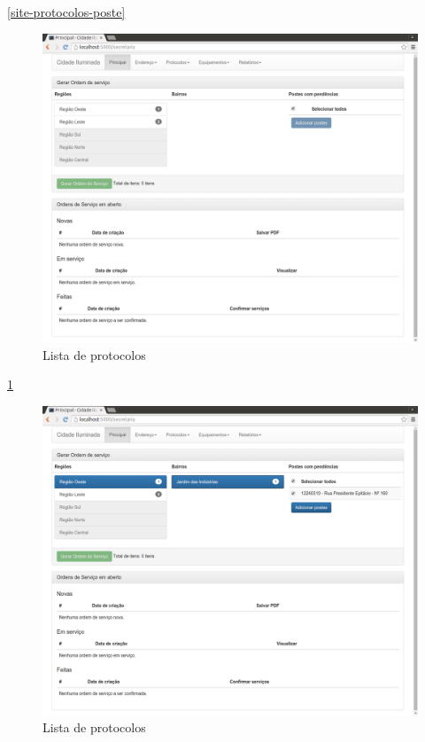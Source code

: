 \documentclass[
	article,			%
	11pt,				%
	oneside,			%
	a4paper,			%
	english,			%
	brazil,				%
	sumario=tradicional
	]{abntex2}
\begin{document}
\ref{site-protocolos-poste}

\begin{figure}[!htbp]
 \centering
 \caption{\label{site-tela-secretaria}Lista de protocolos}
 \includegraphics[scale=0.25]{site/7-tela_secretaria.png}
\end{figure}

\ref{site-tela-secretaria}
\clearpage

\begin{figure}[!htbp]
 \centering
 \caption{\label{site-seleciona-bairro}Lista de protocolos}
 \includegraphics[scale=0.25]{site/8-bairro.png}
\end{figure}
\end{document}
